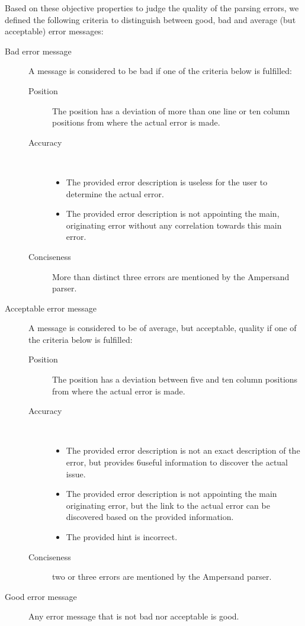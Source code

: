 %
Based on these objective properties to judge the quality of the parsing errors, we defined the following criteria to distinguish between good, bad and average (but acceptable) error messages:
%
\begin{description}
	\item [Bad error message] A message is considered to be bad if one of the criteria below is fulfilled:
		\begin{description}
			\item [Position]
			The position has a deviation of more than one line or ten column positions from where the actual error is made.
			\item [Accuracy]~
				\begin{itemize}
					\item 	The provided error description is useless for the user to determine the actual error.
					\item 	The provided error description is not appointing the main, originating error without any correlation towards this main error.
				\end {itemize}
			\item[Conciseness]
			More than distinct three errors are mentioned by the Ampersand parser.
		\end {description}
	\item [Acceptable error message] A message is considered to be of average, but acceptable, quality if one of the criteria below is fulfilled:
		\begin{description}
			\item [Position]
			The position has a deviation between five and ten column positions from where the actual error is made.
			\item [Accuracy]~
				\begin{itemize}
					\item 	The provided error description is not an exact description of the error, but provides 6useful information to discover the actual issue.
					\item 	The provided error description is not appointing the main originating error, but the link to the actual error can be discovered based on the provided information.
					\item 	The provided hint is incorrect.
				\end {itemize}
			\item[Conciseness]
			two or three errors are mentioned by the Ampersand parser.
		\end {description}
		
	\item [Good error message] Any error message that is not bad nor acceptable is good.
\end {description}

